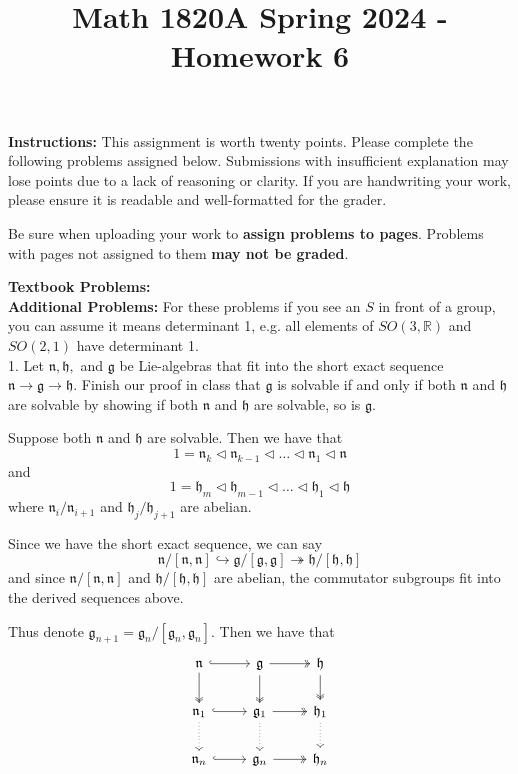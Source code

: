 \documentclass[12pt]{article}
\title{Math 1820A Spring 2024 - Homework 6}
\date{}
\newcommand{\R}{\mathbb{R}}
\newcommand{\lra}{\longrightarrow}
\newcommand{\g}{\mathfrak{g}}
\newcommand{\h}{\mathfrak{h}}
\newcommand{\n}{\mathfrak{n}}
\begin{document}
\maketitle
\vspace{-0.5in}
\begin{spacing}{1.5}
\noindent \textbf{Instructions:}  This assignment is worth twenty points.  Please complete the following problems assigned below.  Submissions with insufficient explanation may lose points due to a lack of reasoning or clarity.  If you are handwriting your work, please ensure it is readable and well-formatted for the grader. 

Be sure when uploading your work to \textbf{assign problems to pages}.  Problems with pages not assigned to them \textbf{may not be graded}.  
\end{spacing}

\vspace{10mm}\noindent
\textbf{Textbook Problems: }\\

\noindent
\textbf{Additional Problems:}   For these problems if you see an $S$ in front of a group, you can assume it means determinant 1, e.g. all elements of $SO(3,\R)$ and $SO(2,1)$ have determinant 1.\\ 

1.  Let $\n, \h,$ and $\g$ be Lie-algebras that fit into the short exact sequence $\n \lra \g \lra \h$.  Finish our proof in class that $\g$ is solvable if and only if both $\n$ and $\h$ are solvable by showing if both $\n$ and $\h$ are solvable, so is $\g$.  

    \color{blue}
        Suppose both $\n$ and $\h$ are solvable. Then we have that 
        \[1 = \n_k \triangleleft \n_{k-1} \triangleleft \dots \triangleleft \n_1 \triangleleft \n\]
        and 
        \[1 = \h_m \triangleleft \h_{m-1} \triangleleft \dots \triangleleft \h_1 \triangleleft \h\]
        where $\n_i/\n_{i+1}$ and $\h_j/\h_{j+1}$ are abelian. 

        Since we have the short exact sequence, we can say 
        \[\n/[\n, \n] \hookrightarrow \g/[\g, \g] \twoheadrightarrow \h/[\h, \h]\]
        and since $\n/[\n, \n]$ and $\h/[\h, \h]$ are abelian, the commutator subgroups fit into the derived sequences above. 

        Thus denote $\g_{n+1} = \g_n/[\g_n, \g_n]$. Then we have that
        \[\begin{tikzcd}
            \n \arrow[r, hook] \arrow[two heads]{d} & \g \arrow[r, two heads] \arrow[two heads]{d} & \h\arrow[two heads]{d}\\ 
            \n_1 \arrow[r, hook] \arrow[dotted]{d} & \g_1 \arrow[r, two heads]{r} \arrow[dotted]{d} & \h_1 \arrow[dotted]{d}\\ 
            \n_n \arrow[r, hook] & \g_n \arrow[r, two heads] & \h_n
        \end{tikzcd}\]
\end{document}
